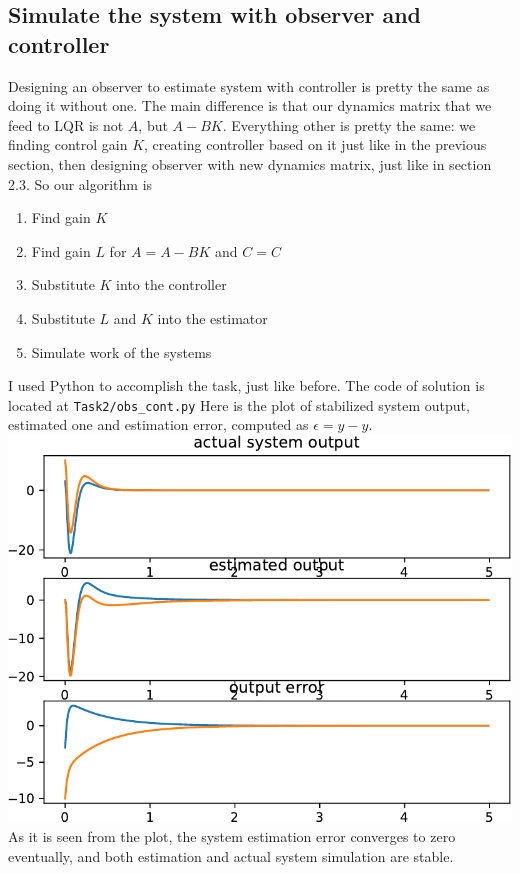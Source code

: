 \documentclass[a4paper,12pt]{article}
\begin{document}
\subsection{Simulate the system with observer and controller}
Designing an observer to estimate system with controller is pretty the same as 
doing it without one. The main difference is that our dynamics matrix that we feed
to LQR is not $A$, but $A-BK$. Everything other is pretty the same: we finding 
control gain $K$, creating controller based on it just like in the previous section,
then designing observer with new dynamics matrix, just like in section 2.3.
So our algorithm is 
\begin{enumerate}
    \item Find gain $K$
    \item Find gain $L$ for $A = A-BK$ and $C=C$
    \item Substitute $K$ into the controller
    \item Substitute $L$ and $K$ into the estimator
    \item Simulate work of the systems
\end{enumerate}
I used Python to accomplish the task, just like before. The code of solution is 
located at \texttt{Task2/obs\_cont.py}
Here is the plot of stabilized system output, estimated one and estimation error,
computed as $\epsilon = y - \hat y$.
\includegraphics[width=\linewidth]{../Task2/est_cont_out.pdf}
As it is seen from the plot, the system estimation error converges to 
zero eventually, and both estimation and actual system simulation are stable.
\end{document}

